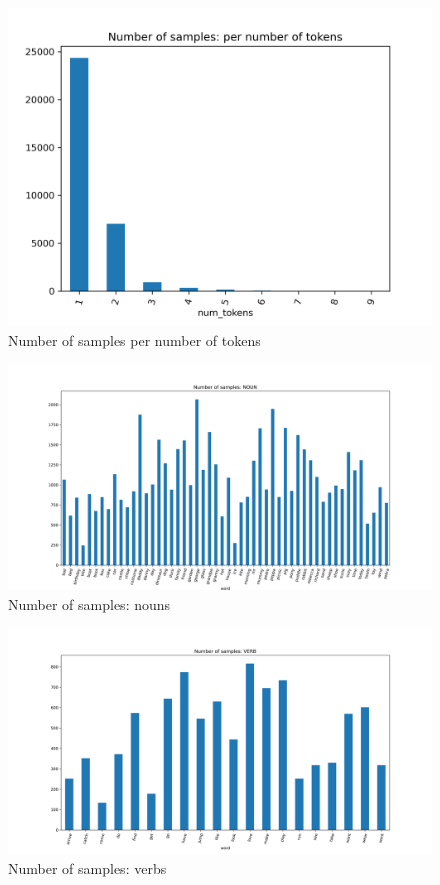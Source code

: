 \begin{figure}
  \centering
  \includegraphics[width=\textwidth]{results/targeted_triplets/num_samples_vs_num_tokens.png}
  \caption{Number of samples per number of tokens}
  \label{fig:num_samples_vs_num_tokens}
\end{figure}

\begin{figure}
  \centering
  \includegraphics[width=\textwidth]{results/targeted_triplets/num_samples_NOUN_word.png}
  \caption{Number of samples: nouns}
  \label{fig:num_samples_NOUN_word}
\end{figure}

\begin{figure}
  \centering
  \includegraphics[width=\textwidth]{results/targeted_triplets/num_samples_VERB_word.png}
  \caption{Number of samples: verbs}
  \label{fig:num_samples_VERB_word}
\end{figure}

